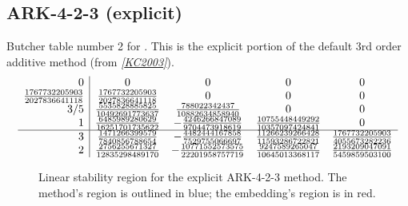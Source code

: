 \documentclass[letterpaper,10pt,english]{sphinxmanual}
\begin{document}
\subsection{ARK-4-2-3 (explicit)}
\label{Butcher:butcher-ark-4-2-3-e}\label{Butcher:ark-4-2-3-explicit}
Butcher table number 2
for {\hyperref[c_interface/User_callable:c.ARKodeSetERKTableNum]{\emph{}}}.  This is
the explicit portion of the default 3rd order additive method (from
\label{Butcher:id2}{\hyperref[References:kc2003]{\emph{{[}KC2003{]}}}}).
\begin{gather}
\begin{split}\begin{array}{r|cccc}
  0 & 0 & 0 & 0 & 0 \\
  \frac{1767732205903}{2027836641118} & \frac{1767732205903}{2027836641118} & 0 & 0 & 0 \\
  3/5 & \frac{5535828885825}{10492691773637} & \frac{788022342437}{10882634858940} & 0 & 0 \\
  1 & \frac{6485989280629}{16251701735622} & -\frac{4246266847089}{9704473918619} & \frac{10755448449292}{10357097424841} & 0 \\
  \hline
  3 & \frac{1471266399579}{7840856788654} & -\frac{4482444167858}{7529755066697} & \frac{11266239266428}{11593286722821} & \frac{1767732205903}{4055673282236} \\
  2 & \frac{2756255671327}{12835298489170} & -\frac{10771552573575}{22201958757719} & \frac{9247589265047}{10645013368117} & \frac{2193209047091}{5459859503100}
\end{array}\end{split}\notag
\end{gather}\begin{figure}[htbp]
\centering
\capstart

\caption{Linear stability region for the explicit ARK-4-2-3 method.  The method's
region is outlined in blue; the embedding's region is in red.}\end{figure}
\end{document}
